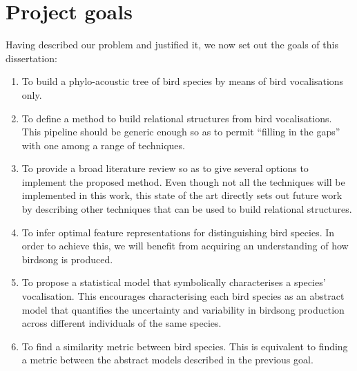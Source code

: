 \documentclass[../main.tex]{subfiles}
\begin{document}
\section{Project goals}
Having described our problem and justified it, we now set out the goals of this dissertation:
\begin{enumerate}
\item To build a phylo-acoustic tree of bird species by means of bird vocalisations only. 
\item To define a method to build relational structures from bird vocalisations. This pipeline should be generic enough so as to permit ``filling in the gaps'' with one among a range of techniques.
\item To provide a broad literature review so as to give several options to implement the proposed method. Even though not all the techniques will be implemented in this work, this state of the art directly sets out future work by describing other techniques that can be used to build relational structures.
\item To infer optimal feature representations for distinguishing bird species. In order to achieve this, we will benefit from acquiring an understanding of how birdsong is produced.
\item To propose a statistical model that symbolically characterises a species' vocalisation. This encourages characterising each bird species as an abstract model that quantifies the uncertainty and variability in birdsong production across different individuals of the same species.
\item To find a similarity metric between bird species. This is equivalent to finding a metric between the abstract models described in the previous goal.
\end{enumerate}
\end{document}
